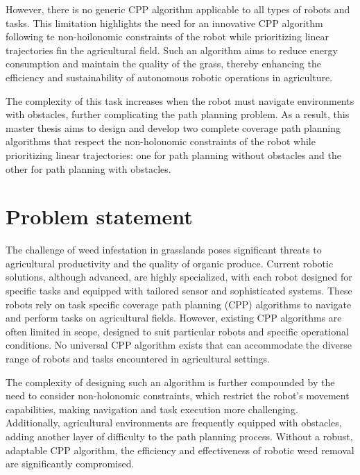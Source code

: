 \vspace*{3mm} 

However, there is no generic CPP algorithm applicable to all types of robots and tasks. This limitation highlights the need for an innovative CPP algorithm following te non-hoilonomic constraints of the robot while prioritizing linear trajectories fin the agricultural field. Such an algorithm aims to reduce energy consumption and maintain the quality of the grass, thereby enhancing the efficiency and sustainability of autonomous robotic operations in agriculture. 

\vspace*{3mm} 

The complexity of this task increases when the robot must navigate environments with obstacles, further complicating the path planning problem. As a result, this master thesis aims to design and develop two complete coverage path planning algorithms that respect the non-holonomic constraints of the robot while prioritizing linear trajectories: one for path planning without obstacles and the other for path planning with obstacles.


\section{Problem statement}

The challenge of weed infestation in grasslands poses significant threats to agricultural productivity and the quality of organic produce. Current robotic solutions, although advanced, are highly specialized, with each robot designed for specific tasks and equipped with tailored sensor and sophisticated systems. These robots rely on task specific coverage path planning (CPP) algorithms to navigate and perform tasks on agricultural fields. However, existing CPP algorithms are often limited in scope, designed to suit particular robots and specific operational conditions. No universal CPP algorithm exists that can accommodate the diverse range of robots and tasks encountered in agricultural settings.

\vspace*{3mm} 

The complexity of designing such an algorithm is further compounded by the need to consider non-holonomic constraints, which restrict the robot’s movement capabilities, making navigation and task execution more challenging. Additionally, agricultural environments are frequently equipped with obstacles, adding another layer of difficulty to the path planning process. Without a robust, adaptable CPP algorithm, the efficiency and effectiveness of robotic weed removal are significantly compromised. 

